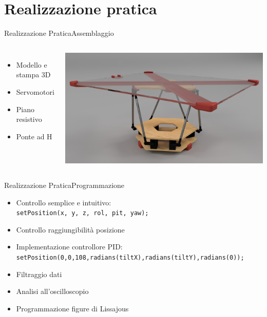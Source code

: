 \documentclass[10pt,aspectratio=169
	]{beamer}
\begin{document}
	\section{Realizzazione pratica}
	\begin{frame}{Realizzazione Pratica}{Assemblaggio}

	\begin{columns}
	
	\begin{itemize}
		\item Modello e stampa 3D
		\item Servomotori
		\item Piano resistivo
		\item Ponte ad H
	\end{itemize}
	\centering \includegraphics[width=\textwidth]{./images/stewart.png}
	\end{columns}
	\end{frame}
	
	\begin{frame}{Realizzazione Pratica}{Programmazione}

	
	\begin{itemize}
		\item Controllo semplice e intuitivo:\\ 
		\texttt{setPosition(x, y, z, rol, pit, yaw);}
		\item Controllo raggiungibilità posizione
		\item Implementazione controllore PID: 	\\
		\texttt{setPosition(0,0,108,radians(tiltX),radians(tiltY),radians(0));}
		\item Filtraggio dati
		\item Analisi all'oscilloscopio
		\item Programmazione figure di Lissajous
	\end{itemize}

	\end{frame}
	
\end{document}
